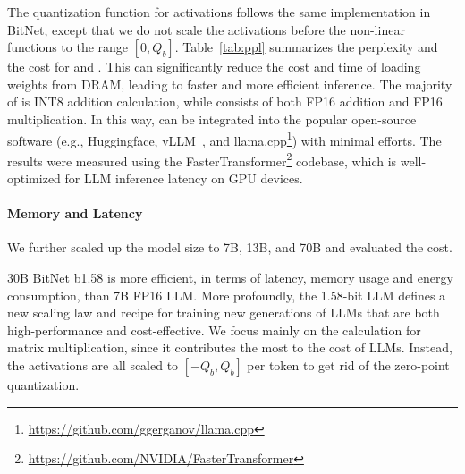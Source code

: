 The quantization function for activations follows the same implementation in BitNet, except that we do not scale the activations before the non-linear functions to the range $[0, Q_b]$. Table~\ref{tab:ppl} summarizes the perplexity and the cost for  and . This can significantly reduce the cost and time of loading weights from DRAM, leading to faster and more efficient inference. The majority of  is INT8 addition calculation, while  consists of both FP16 addition and FP16 multiplication. In this way,  can be integrated into the popular open-source software (e.g., Huggingface, vLLM~\cite{vllm}, and llama.cpp\footnote{\url{https://github.com/ggerganov/llama.cpp}}) with minimal efforts. The results were measured using the FasterTransformer\footnote{\url{https://github.com/NVIDIA/FasterTransformer}} codebase, which is well-optimized for LLM inference latency on GPU devices. \paragraph{Memory and Latency}

We further scaled up the model size to 7B, 13B, and 70B and evaluated the cost. \item 30B BitNet b1.58 is more efficient, in terms of latency, memory usage and energy consumption, than 7B FP16 LLM. More profoundly, the 1.58-bit LLM defines a new scaling law and recipe for training new generations of LLMs that are both high-performance and cost-effective. We focus mainly on the calculation for matrix multiplication, since it contributes the most to the cost of LLMs. Instead, the activations are all scaled to $[-Q_b, Q_b]$ per token to get rid of the zero-point quantization.